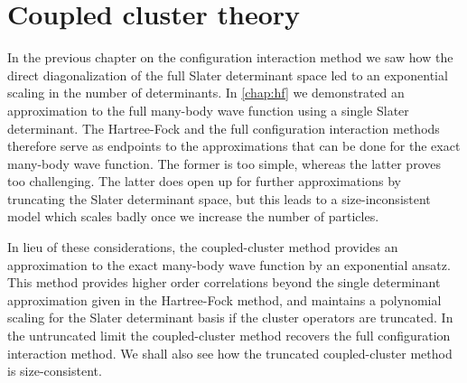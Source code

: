 \chapter{Coupled cluster theory}
    \label{chap:cc}
    In the previous chapter on the configuration interaction method we saw how
    the direct diagonalization of the full Slater determinant space led to an
    exponential scaling in the number of determinants.
    In \autoref{chap:hf} we demonstrated an approximation to the full many-body
    wave function using a single Slater determinant.
    The Hartree-Fock and the full configuration interaction methods therefore
    serve as endpoints to the approximations that can be done for the exact
    many-body wave function.
    The former is too simple, whereas the latter proves too challenging.
    The latter does open up for further approximations by truncating the Slater
    determinant space, but this leads to a size-inconsistent model which scales
    badly once we increase the number of particles.

    In lieu of these considerations, the coupled-cluster method provides an
    approximation to the exact many-body wave function by an exponential ansatz.
    This method provides higher order correlations beyond the single determinant
    approximation given in the Hartree-Fock method, and maintains a polynomial
    scaling for the Slater determinant basis if the cluster operators are
    truncated.
    In the untruncated limit the coupled-cluster method recovers the full
    configuration interaction method.
    We shall also see how the truncated coupled-cluster method is
    size-consistent.


